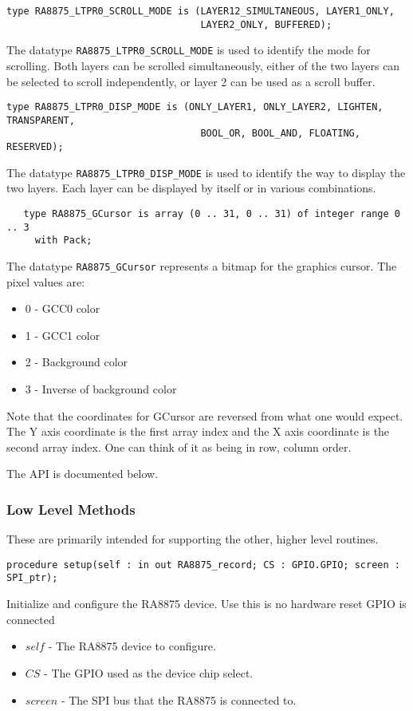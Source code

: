 \documentclass[10pt, openany]{book}
\newcommand{\datatype}[1]{\texttt{#1}}
\begin{document}
\begin{lstlisting}
type RA8875_LTPR0_SCROLL_MODE is (LAYER12_SIMULTANEOUS, LAYER1_ONLY,
                                  LAYER2_ONLY, BUFFERED);
\end{lstlisting}
The datatype \datatype{RA8875\_LTPR0\_SCROLL\_MODE} is used to identify the mode for scrolling.  Both layers can be scrolled simultaneously, either of the two layers can be selected to scroll independently, or layer 2 can be used as a scroll buffer.

\begin{lstlisting}
type RA8875_LTPR0_DISP_MODE is (ONLY_LAYER1, ONLY_LAYER2, LIGHTEN, TRANSPARENT,
                                  BOOL_OR, BOOL_AND, FLOATING, RESERVED);
\end{lstlisting}
The datatype \datatype{RA8875\_LTPR0\_DISP\_MODE} is used to identify the way to display the two layers.  Each layer can be displayed by itself or in various combinations.

\begin{lstlisting}
   type RA8875_GCursor is array (0 .. 31, 0 .. 31) of integer range 0 .. 3
     with Pack;
\end{lstlisting}
The datatype \datatype{RA8875\_GCursor} represents a bitmap for the graphics cursor.  The pixel values are:
\begin{itemize}
  \item 0 - GCC0 color
  \item 1 - GCC1 color
  \item 2 - Background color
  \item 3 - Inverse of background color
\end{itemize}
Note that the coordinates for GCursor are reversed from what one would expect.  The Y axis coordinate is the first array index and the X axis coordinate is the second array index.  One can think of it as being in row, column order.

The API is documented below.

\subsubsection{Low Level Methods}
These are primarily intended for supporting the other, higher level routines.
\begin{lstlisting}
procedure setup(self : in out RA8875_record; CS : GPIO.GPIO; screen : SPI_ptr);
\end{lstlisting}
Initialize and configure the RA8875 device.  Use this is no hardware reset GPIO is connected
\begin{itemize}
  \item $self$ - The RA8875 device to configure.
  \item $CS$ - The GPIO used as the device chip select.
  \item $screen$ - The SPI bus that the RA8875 is connected to.
\end{itemize}
\end{document}
